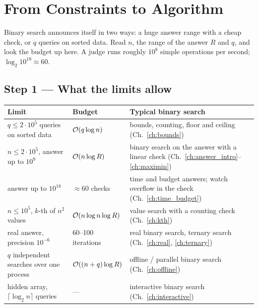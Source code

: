 \chapter{From Constraints to Algorithm}
\label{ch:constraints}

Binary search announces itself in two ways: a huge answer range with a cheap check, or $q$ queries on sorted data. Read $n$, the range of the answer $R$ and $q$, and look the budget up here. A judge runs roughly $10^8$ simple operations per second; $\log_2 10^{18} \approx 60$.

\section*{Step 1 --- What the limits allow}

\begingroup\small\renewcommand{\arraystretch}{1.3}
\begin{tabularx}{\linewidth}{@{}l l X@{}}
\toprule
\textbf{Limit} & \textbf{Budget} & \textbf{Typical binary search} \\
\midrule
$q \le 2\cdot10^5$ queries on sorted data & $\mathcal{O}(q \log n)$ & bounds, counting, floor and ceiling (Ch.~\ref{ch:bounds}) \\
$n \le 2\cdot10^5$, answer up to $10^9$ & $\mathcal{O}(n \log R)$ & binary search on the answer with a linear check (Ch.~\ref{ch:answer_intro}--\ref{ch:maximin}) \\
answer up to $10^{18}$ & $\approx 60$ checks & time and budget answers; watch overflow in the check (Ch.~\ref{ch:time_budget}) \\
$n \le 10^5$, $k$-th of $n^2$ values & $\mathcal{O}(n \log n \log R)$ & value search with a counting check (Ch.~\ref{ch:kth}) \\
real answer, precision $10^{-6}$ & 60--100 iterations & real binary search, ternary search (Ch.~\ref{ch:real}, \ref{ch:ternary}) \\
$q$ independent searches over one process & $\mathcal{O}((n+q) \log R)$ & offline / parallel binary search (Ch.~\ref{ch:offline}) \\
hidden array, $\lceil\log_2 n\rceil$ queries & --- & interactive binary search (Ch.~\ref{ch:interactive}) \\
\bottomrule
\end{tabularx}
\endgroup

